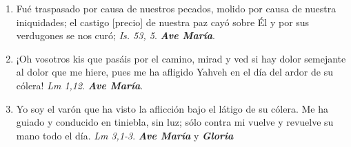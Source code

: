 \documentclass[../../devocionario.tex]{subfiles}
\begin{document}
\begin{enumerate}
        \item Fué traspasado por causa de nuestros pecados, molido por causa de nuestra iniquidades; 
            el castigo [precio] de nuestra paz cayó sobre Él y por sus verdugones se nos curó; \textit{Is. 53, 5}. \textbf{\textit{Ave María}}.

        \item ¡Oh vosotros kis que pasáis por el camino, mirad y ved si hay dolor semejante al dolor que me hiere, 
            pues me ha afligido Yahveh en el día del ardor de su cólera! \textit{Lm 1,12}. \textbf{\textit{Ave María}}.

        \item Yo soy el varón que ha visto la aflicción bajo el látigo de su cólera. Me ha guiado y conducido en tiniebla, 
            sin luz; sólo contra mi vuelve y revuelve su mano todo el día. \textit{Lm 3,1-3}. \textbf{\textit{Ave María}} y \textbf{\textit{Gloria}}

    \end{enumerate}
\end{document}
